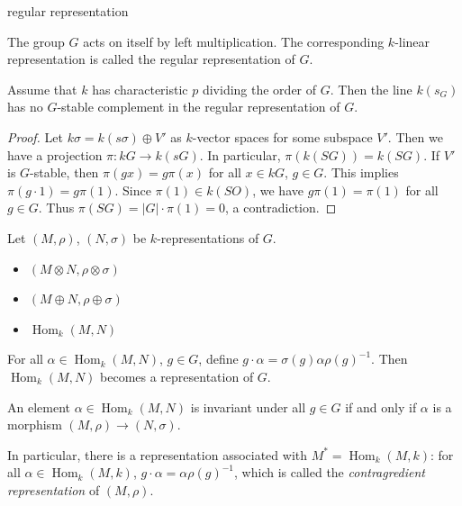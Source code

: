 \documentclass[11pt, a4paper]{report}
\begin{document}
\begin{definition}
regular representation

The group $G$ acts on itself by left multiplication. The corresponding $k$-linear representation is called the regular representation of $G$.

\end{definition}

\begin{lemma}

Assume that $k$ has characteristic $p$ dividing the order of $G$. Then the line $k(s_G)$ has no $G$-stable complement in the regular representation of $G$.
\end{lemma}
\begin{proof}
Let $k\sigma = k(s\sigma) \oplus V'$ as $k$-vector spaces for some subspace $V'$. Then we have a projection $\pi: kG \rightarrow k(sG)$. In particular, $\pi(k(SG)) = k(SG)$. If $V'$ is $G$-stable, then $\pi(gx) = g\pi(x)$ for all $x \in kG$, $g \in G$. This implies $\pi(g \cdot 1) = g\pi(1)$. Since $\pi(1) \in k(SO)$, we have $g\pi(1) = \pi(1)$ for all $g \in G$. Thus $\pi(SG) = |G| \cdot \pi(1) = 0$, a contradiction.
\end{proof}

\begin{definition}
Let $(M, \rho)$, $(N, \sigma)$ be $k$-representations of $G$.
\begin{itemize}
\item $(M \otimes N, \rho \otimes \sigma)$
\item $(M \oplus N, \rho \oplus \sigma)$
\item $\operatorname{Hom}_{k}(M, N)$
\end{itemize}

For all $\alpha \in \operatorname{Hom}_{k}(M, N)$, $g \in G$, define $g \cdot \alpha = \sigma(g)\alpha\rho(g)^{-1}$. Then $\operatorname{Hom}_{k}(M, N)$ becomes a representation of $G$.

An element $\alpha \in \operatorname{Hom}_{k}(M, N)$ is invariant under all $g \in G$ if and only if $\alpha$ is a morphism $(M, \rho) \rightarrow (N, \sigma)$.

In particular, there is a representation associated with $M^{*} = \operatorname{Hom}_{k}(M, k)$: for all $\alpha \in \operatorname{Hom}_{k}(M, k)$, $g \cdot \alpha = \alpha \rho(g)^{-1}$, which is called the \emph{contragredient representation} of $(M, \rho)$.
\end{definition}
\end{document}
